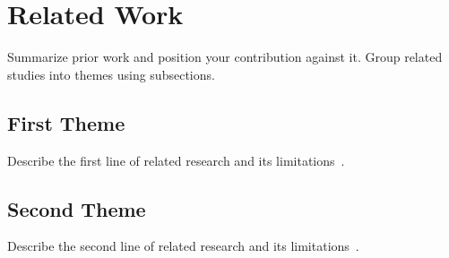 \section{Related Work}
\label{sec:related}

Summarize prior work and position your contribution against it. Group
related studies into themes using subsections.

\subsection{First Theme}
Describe the first line of related research and its limitations~\cite{ref1}.

\subsection{Second Theme}
Describe the second line of related research and its limitations~\cite{ref2}.
